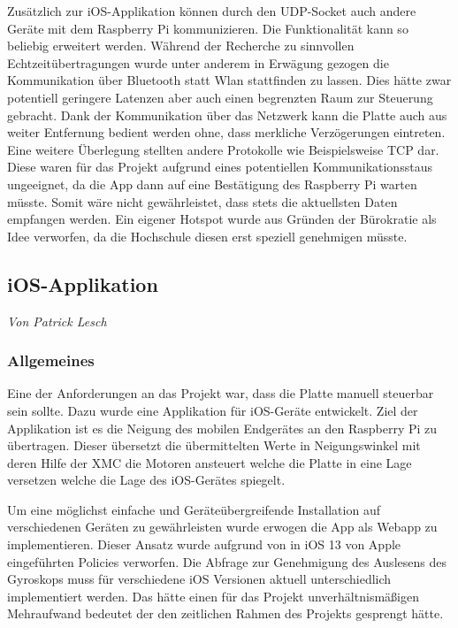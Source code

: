 \documentclass[12pt,a4paper,bibliography=totoc,listof=totoc]{scrartcl}
\begin{document}
Zusätzlich zur iOS-Applikation können durch den UDP-Socket auch andere Geräte mit dem Raspberry Pi kommunizieren. Die Funktionalität kann so
beliebig erweitert werden. Während der Recherche zu sinnvollen Echtzeitübertragungen wurde unter anderem in Erwägung gezogen die Kommunikation
über Bluetooth statt Wlan stattfinden zu lassen. Dies hätte zwar potentiell geringere Latenzen aber auch einen begrenzten Raum zur Steuerung gebracht.
Dank der Kommunikation über das Netzwerk kann die Platte auch aus weiter Entfernung bedient werden ohne, dass merkliche Verzögerungen eintreten. 
Eine weitere Überlegung stellten andere Protokolle wie Beispielsweise TCP dar. Diese waren für das Projekt aufgrund eines potentiellen Kommunikationsstaus 
ungeeignet, da die App dann auf eine Bestätigung des Raspberry Pi warten müsste. Somit wäre nicht gewährleistet, dass stets die aktuellsten Daten
empfangen werden. Ein eigener Hotspot wurde aus Gründen der Bürokratie als Idee verworfen, da die Hochschule diesen erst speziell genehmigen müsste.

\subsection{iOS-Applikation}
\textit{Von Patrick Lesch}\newline

\subsubsection{Allgemeines}
Eine der Anforderungen an das Projekt war, dass die Platte manuell steuerbar sein sollte. Dazu wurde eine Applikation für 
iOS-Geräte entwickelt. Ziel der Applikation ist es die Neigung des mobilen Endgerätes an den Raspberry Pi zu übertragen. 
Dieser übersetzt die übermittelten Werte in Neigungswinkel mit deren Hilfe der XMC die Motoren ansteuert welche die Platte 
in eine Lage versetzen welche die Lage des iOS-Gerätes spiegelt.

Um eine möglichst einfache und Geräteübergreifende Installation auf verschiedenen Geräten zu gewährleisten wurde erwogen die App 
als Webapp zu implementieren. Dieser Ansatz wurde aufgrund von in iOS 13 von Apple eingeführten Policies verworfen. Die Abfrage zur Genehmigung
des Auslesens des Gyroskops muss für verschiedene iOS Versionen aktuell unterschiedlich implementiert werden. Das hätte einen für das Projekt
unverhältnismäßigen Mehraufwand bedeutet der den zeitlichen Rahmen des Projekts gesprengt hätte. 
\end{document}
